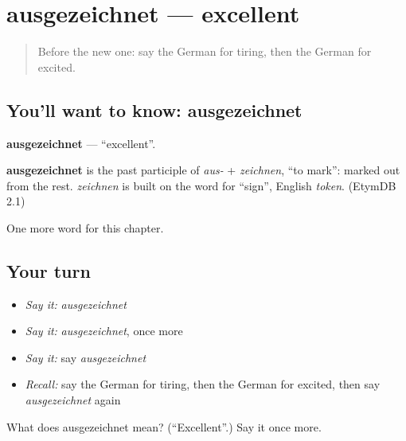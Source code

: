 \section[ausgezeichnet]{ausgezeichnet — excellent}

\label{lesson:GE-C211-ausgezeichnet}



\begin{quote}
Before the new one: say the German for tiring, then the German for excited.
\end{quote}

\subsection*{You'll want to know: ausgezeichnet}
\textbf{ausgezeichnet} — \textquotedblleft{}excellent\textquotedblright{}.

\begin{cousinweb}
\textbf{ausgezeichnet} is the past participle of \emph{aus-} + \emph{zeichnen}, \textquotedblleft{}to mark\textquotedblright{}: marked out from the rest. \emph{zeichnen} is built on the word for \textquotedblleft{}sign\textquotedblright{}, English \emph{token}. (EtymDB 2.1)
\end{cousinweb}

\begin{grammarlens}[title={What you've built}]
One more word for this chapter.
\end{grammarlens}

\subsection*{Your turn}
\begin{itemize}
\raggedright
  \item \emph{Say it:} \emph{ausgezeichnet}
  \item \emph{Say it:} \emph{ausgezeichnet}, once more
  \item \emph{Say it:} say \emph{ausgezeichnet}
  \item \emph{Recall:} say the German for tiring, then the German for excited, then say \emph{ausgezeichnet} again
\end{itemize}

\begin{tcolorbox}[breakable,colback=teal!4,colframe=teal!35!black,title={Before you move on}]
What does ausgezeichnet mean? (\textquotedblleft{}Excellent\textquotedblright{}.) Say it once more.
\end{tcolorbox}
